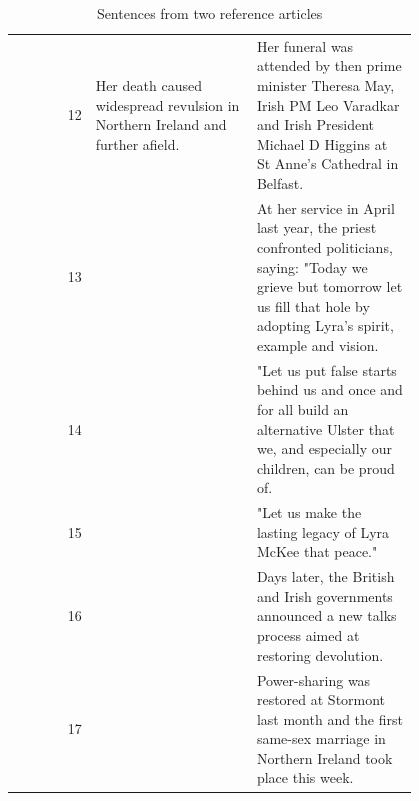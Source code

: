 \begin{table}[!htbp]
\begin{tabular}{r | p{0.4\linewidth} | p{0.4\linewidth} }
        12\vspace{-2px} & \tiny{Her death caused widespread revulsion in Northern Ireland and further afield.}\vspace{-2px} & \tiny{Her funeral was attended by then prime minister Theresa May, Irish PM Leo Varadkar and Irish President Michael D Higgins at St Anne's Cathedral in Belfast.}\vspace{-2px} \\
        13\vspace{-2px} &  & \tiny{At her service in April last year, the priest confronted politicians, saying: "Today we grieve but tomorrow let us fill that hole by adopting Lyra's spirit, example and vision.}\vspace{-2px} \\
        14\vspace{-2px} &  & \tiny{"Let us put false starts behind us and once and for all build an alternative Ulster that we, and especially our children, can be proud of.}\vspace{-2px} \\
        15\vspace{-2px} &  & \tiny{"Let us make the lasting legacy of Lyra McKee that peace."}\vspace{-2px} \\
        16\vspace{-2px} &  & \tiny{Days later, the British and Irish governments announced a new talks process aimed at restoring devolution.}\vspace{-2px} \\
        17\vspace{-2px} &  & \tiny{Power-sharing was restored at Stormont last month and the first same-sex marriage in Northern Ireland took place this week.} \vspace{-2px}
       \end{tabular}
       \caption{Sentences from two reference articles}
       \label{tab:sentences}
\end{table}



